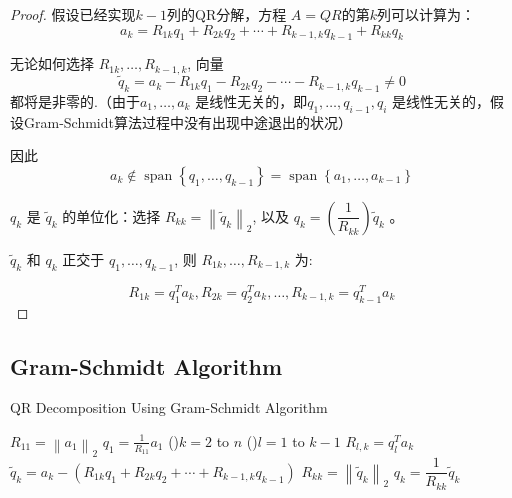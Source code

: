 \begin{proof}


    假设已经实现$k - 1$列的QR分解，方程 $A= QR$的第$k$列可以计算为：
$$
a_{k}=R_{1 k} q_{1}+R_{2 k} q_{2}+\cdots+R_{k-1, k} q_{k-1}+R_{k k} q_{k}
$$

无论如何选择 $R_{1 k}, \ldots, R_{k-1, k}$, 向量
$$
\tilde{q}_{k}=a_{k}-R_{1 k} q_{1}-R_{2 k} q_{2}-\cdots-R_{k-1, k} q_{k-1} \neq 0
$$
都将是非零的.（由于$a_{1}, \ldots, a_{k}$ 是线性无关的，即$q_{1}, \ldots, q_{i-1}, q_{i} $ 是线性无关的，假设Gram-Schmidt算法过程中没有出现中途退出的状况）

因此
$$
a_{k} \notin \operatorname{span}\left\{q_{1}, \ldots, q_{k-1}\right\}=\operatorname{span}\left\{a_{1}, \ldots, a_{k-1}\right\}
$$

$q_{k}$ 是 $\tilde{q}_{k}$ 的单位化：选择 $R_{k k}=\left\|\tilde{q}_{k}\right\|_{2}$, 以及 $q_{k}=\left(\dfrac{1}{R_{kk}} \right) \tilde{q}_{k}$ 。 

$\tilde{q}_{k}$ 和 $q_{k}$ 正交于 $q_{1}, \ldots, q_{k-1}$, 则 $R_{1 k}, \ldots, R_{k-1, k}$ 为:

$$R_{1 k}=q_{1}^{T} a_{k},  R_{2 k}=q_{2}^{T} a_{k}, \ldots,  R_{k-1, k}=q_{k-1}^{T} a_{k}$$
\end{proof}

\subsection{Gram-Schmidt Algorithm}

\begin{algorithm}[htbp]
    \caption{QR Decomposition Using Gram-Schmidt Algorithm}


    $R_{11}=\left\|a_{1}\right\|_{2}$ \;
     $q_{1}=\frac{1}{R_{11}} a_{1}$ \;
\For(){$k=2$ to $n$}{
    \For(){$l=1$ to $k-1$}{
$R_{l, k} =q_{l}^{T} a_{k}$ \;}
$\tilde{q}_{k} =a_{k}-\left(R_{1 k} q_{1}+R_{2 k} q_{2}+\cdots+R_{k-1, k} q_{k-1}\right)$ \;
$R_{k k} =\left\|\tilde{q}_{k}\right\|_{2}$ \;
 $q_{k} =\dfrac{1}{R_{k k}} \tilde{q}_{k}$ \;
}
\end{algorithm}


